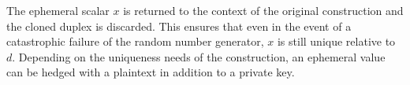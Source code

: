 The ephemeral scalar $x$ is returned to the context of the original construction and the cloned duplex is discarded.
This ensures that even in the event of a catastrophic failure of the random number generator, $x$ is still unique
relative to $d$.
Depending on the uniqueness needs of the construction, an ephemeral value can be hedged with a plaintext in addition to
a private key.
